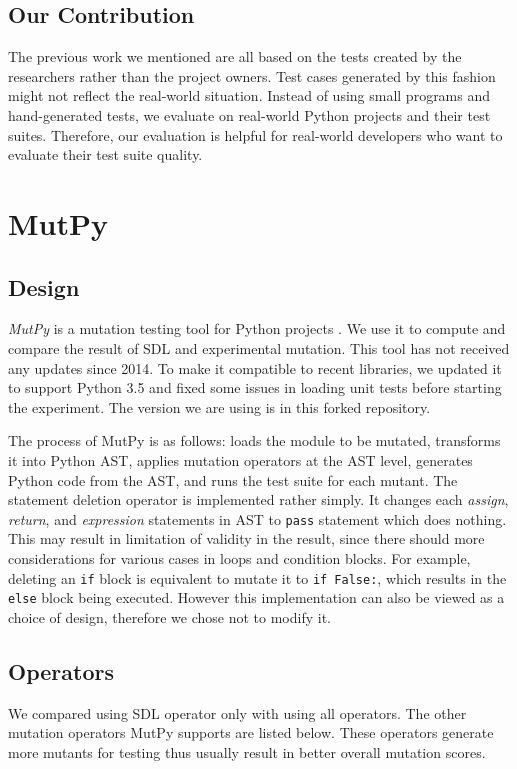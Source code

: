 \documentclass[12pt]{article}
\begin{document}
\subsection{Our Contribution}

The previous work we mentioned are all based on the tests created by the researchers rather than the project owners. Test cases generated by this fashion might not reflect the real-world situation. Instead of using small programs and hand-generated tests, we evaluate on real-world Python projects and their test suites. Therefore, our evaluation is helpful for real-world developers who want to evaluate their test suite quality.

\section{MutPy}

\subsection{Design}
\emph{MutPy} is a mutation testing tool for Python projects \cite{mutpy}. We use it to compute and compare the result of SDL and experimental mutation. This tool has not received any updates since 2014. To make it compatible to recent libraries, we updated it to support Python 3.5 and fixed some issues in loading unit tests before starting the experiment. The version we are using is in this forked repository.

The process of MutPy is as follows: loads the module to be mutated, transforms it into Python AST, applies mutation operators at the AST level, generates Python code from the AST, and runs the test suite for each mutant. The statement deletion operator is implemented rather simply. It changes each \emph{assign}, \emph{return}, and \emph{expression} statements in AST to \texttt{pass} statement which does nothing. This may result in limitation of validity in the result, since there should more considerations for various cases in loops and condition blocks. For example, deleting an \texttt{if} block is equivalent to mutate it to \texttt{if False:}, which results in the \texttt{else} block being executed. However this implementation can also be viewed as a choice of design, therefore we chose not to modify it.

\subsection{Operators}
We compared using SDL operator only with using all operators. The other mutation operators MutPy supports are listed below. These operators generate more mutants for testing thus usually result in better overall mutation scores.
\end{document}
